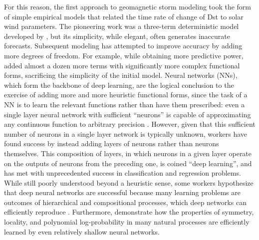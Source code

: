 For this reason, the first approach to geomagnetic storm modeling took the form of simple empirical models that related the time rate of change of Dst to solar wind parameters. The pioneering work was a three-term deterministic model developed by \cite{Burton1975}, but its simplicity, while elegant, often generates inaccurate forecasts. Subsequent modeling has attempted to improve accuracy by adding more degrees of freedom. For example, while obtaining more predictive power, \cite{Temerin2006} added almost a dozen more terms with significantly more complex functional forms, sacrificing the simplicity of the initial model. Neural networks (NNs), which form the backbone of deep learning, are the logical conclusion to the exercise of adding more and more heuristic functional forms, since the task of a NN is to learn the relevant functions rather than have them prescribed: even a single layer neural network with sufficient ``neurons'' is capable of approximating any continuous function to arbitrary precision  \citep{Leshno1993,Pinkus1999}. However, given that this sufficient number of neurons in a single layer network is typically unknown, workers have found success by instead adding layers of neurons rather than neurons themselves. This composition of layers, in which neurons in a given layer operate on the outputs of neurons from the preceding one, is coined ``deep learning'', and has met with unprecedented success in classification and regression problems. While still poorly understood beyond a heuristic sense, some workers hypothesize that deep neural networks are successful because many learning problems are outcomes of hierarchical and compositional processes, which deep networks can efficiently reproduce \citep{Lin2017, Brahma2016}. Furthermore, \cite{Lin2017} demonstrate how the properties of symmetry, locality, and polynomial log-probability in many natural processes are efficiently learned by even relatively shallow neural networks.

